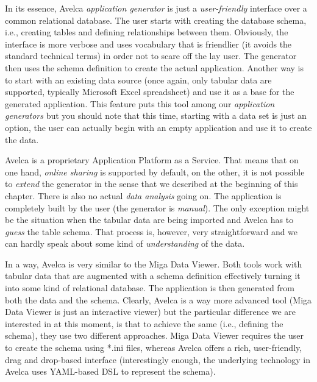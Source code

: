 In its essence, Avelca \emph{application generator} is just a \emph{user-friendly} interface over a common relational database. The user starts with creating the database schema, i.e., creating tables and defining relationships between them. Obviously, the interface is more verbose and uses vocabulary that is friendlier (it avoids the standard technical terms) in order not to scare off the lay user. The generator then uses the schema definition to create the actual application. Another way is to start with an existing data source (once again, only tabular data are supported, typically Microsoft Excel spreadsheet) and use it as a base for the generated application. This feature puts this tool among our \emph{application generators} but you should note that this time, starting with a data set is just an option, the user can actually begin with an empty application and use it to create the data.

Avelca is a proprietary Application Platform as a Service. That means that on one hand, \emph{online sharing} is supported by default, on the other, it is not possible to \emph{extend} the generator in the sense that we described at the beginning of this chapter. There is also no actual \emph{data analysis} going on. The application is completely built by the user (the generator is \emph{manual}). The only exception might be the situation when the tabular data are being imported and Avelca has to \emph{guess} the table schema. That process is, however, very straightforward and we can hardly speak about some kind of \emph{understanding} of the data.

In a way, Avelca is very similar to the Miga Data Viewer. Both tools work with tabular data that are augmented with a schema definition effectively turning it into some kind of relational database. The application is then generated from both the data and the schema. Clearly, Avelca is a way more advanced tool (Miga Data Viewer is just an interactive viewer) but the particular difference we are interested in at this moment, is that to achieve the same (i.e., defining the schema), they use two different approaches. Miga Data Viewer requires the user to create the schema using *.ini files, whereas Avelca offers a rich, user-friendly, drag and drop-based interface (interestingly enough, the underlying technology in Avelca uses YAML-based DSL to represent the schema).

